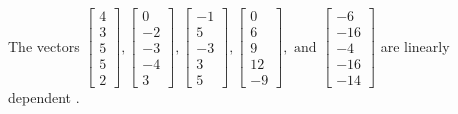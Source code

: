 \begin{exercise}
\begin{exerciseStatement}
  \end{exerciseStatement}
  \begin{exerciseAnswer}
   The vectors \(\left[\begin{array}{r}
4 \\
3 \\
5 \\
5 \\
2
\end{array}\right] , \left[\begin{array}{r}
0 \\
-2 \\
-3 \\
-4 \\
3
\end{array}\right] , \left[\begin{array}{r}
-1 \\
5 \\
-3 \\
3 \\
5
\end{array}\right] , \left[\begin{array}{r}
0 \\
6 \\
9 \\
12 \\
-9
\end{array}\right] , \text{ and } \left[\begin{array}{r}
-6 \\
-16 \\
-4 \\
-16 \\
-14
\end{array}\right]\) are 
  	 linearly dependent  .
  


  \end{exerciseAnswer}
\end{exercise}